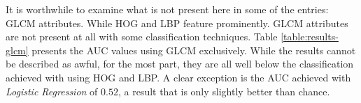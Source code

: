 \documentclass[letterpaper]{report}
\begin{document}

\begin{tiny}
\renewcommand{\arraystretch}{1.2}




\end{tiny}

It is worthwhile to examine what is not present here in some of the entries: GLCM attributes. While HOG and LBP feature prominently. GLCM attributes are not present at all with some classification techniques. Table \ref{table:results-glcm} presents the AUC values using GLCM exclusively. While the results cannot be described as awful, for the most part, they are all well below the classification achieved with using HOG and LBP. A clear exception is the AUC achieved with \textit{Logistic Regression} of $0.52$, a result that is only slightly better than chance.

\begin{tiny}
\renewcommand{\arraystretch}{1.2}

\end{tiny}
\end{document}
